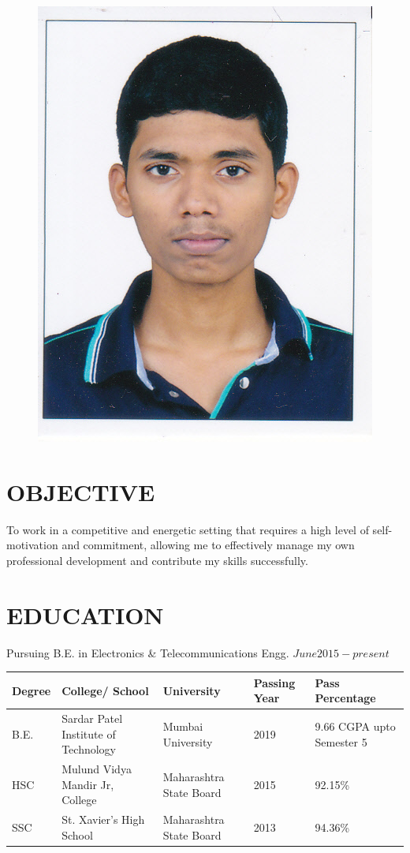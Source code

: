 \documentclass[margin]{res}
\begin{document}

\address{302 Matoshree Pearl\\Shree Rameshwar CHS\\Opp. Dreams Mall, LBS Marg\\Bhandup(W)\\Mumbai-400078} 

\address{Contact No. +91 9867906725\\
Email id: shedekarhrishi@gmail.com} 


\begin{resume}


\begin{figure}[ht]
    \includegraphics[width=.3\textwidth,right]{me}
\end{figure}

\section{OBJECTIVE}  

To work in a competitive and energetic setting that requires a high level of self-motivation and commitment, allowing me to effectively manage my own professional development and contribute my skills successfully.


\section{EDUCATION}


Pursuing B.E. in Electronics \& Telecommunications Engg. \hfill \(June 2015 - present\)
\begin{flushleft}
\begin{tabular}{ |m{3em}|m{10em}|m{6em}|m{4em}|m{8em}| } 
 \hline
\textbf{Degree} & \textbf{College/ School} & \textbf{University} & \textbf{Passing Year} & \textbf{Pass}\hspace{16mm} \textbf{Percentage}\\
 \hline 
 B.E. & Sardar Patel Institute of Technology & Mumbai \hspace{10mm}University & 2019 & 9.66 CGPA upto Semester 5 \\ 
 \hline
  HSC & Mulund Vidya Mandir Jr, College & Maharashtra State Board & 2015 & 92.15\% \\ 
 \hline
 SSC & St. Xavier's High School & Maharashtra State Board & 2013 & 94.36\% \\ 
 \hline
 

\end{tabular}
\end{flushleft}
\end{resume}
\end{document}
